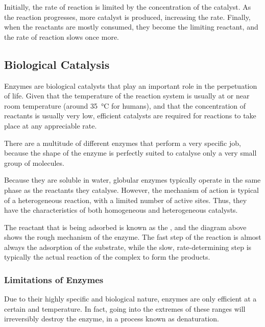 			Initially, the rate of reaction is limited by the concentration of the catalyst. As the reaction progresses, more catalyst
			is produced, increasing the rate. Finally, when the reactants are mostly consumed, they become the limiting reactant, and the
			rate of reaction slows once more.



		\pagebreak
		\subsection{Biological Catalysis}
			Enzymes are biological catalysts that play an important role in the perpetuation of life. Given that the temperature of the
			reaction system is usually at or near room temperature (around \SI{35}{\celsius} for humans), and that the concentration of reactants
			is usually very low, efficient catalysts are required for reactions to take place at any appreciable rate.

			There are a multitude of different enzymes that perform a very specific job, because the shape of the enzyme is perfectly suited
			to catalyse only a very small group of molecules.

			Because they are soluble in water, globular enzymes typically operate in the same phase as the reactants they catalyse. However, the
			mechanism of action is typical of a heterogeneous reaction, with a limited number of active sites. Thus, they have the characteristics
			of both homogeneous and heterogeneous catalysts.


			The reactant that is being adsorbed is known as the , and the diagram above shows the rough mechanism of the
			enzyme. The fast step of the reaction is almost always the adsorption of the substrate, while the slow, rate-determining step is
			typically the actual reaction of the complex to form the products.


			\subsubsection{Limitations of Enzymes}

				Due to their highly specific and biological nature, enzymes are only efficient at a certain \pH{} and temperature. In fact,
				going into the extremes of these ranges will irreversibly destroy the enzyme, in a process known as denaturation.

